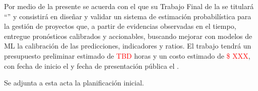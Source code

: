 \documentclass[12pt]
{charter}
\begin{document}
Por medio de la presente se acuerda con el \authorname\hspace{1px} que su Trabajo Final de la \degreename\hspace{1px} se titulará ``\ttitle'' y consistirá en diseñar y validar un sistema de estimación probabilística para la gestión de proyectos que, a partir de evidencias observadas en el tiempo, entregue pronósticos calibrados y accionables, buscando mejorar con modelos de ML la calibración de las predicciones, indicadores y ratios. El trabajo tendrá un presupuesto preliminar estimado de \textcolor{red}{TBD} horas y un costo estimado de \textcolor{red}{\$ XXX}, con fecha de inicio el \fechaInicioName\hspace{1px} y fecha de presentación pública el \textcolor{red}{\fechaFinalName}.

Se adjunta a esta acta la planificación inicial.

\vfill

\end{document}
